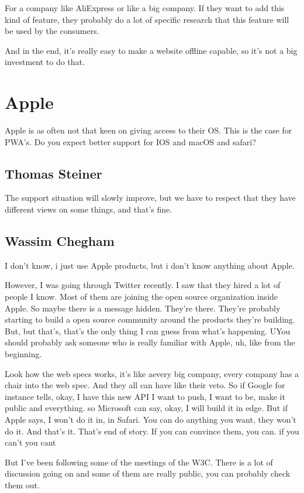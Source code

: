 			For a company like AliExpress or like a big company. If they want to add this kind of feature, they probably do a lot of specific research that this feature will be used by the consumers.
			
			And in the end, it's really easy to make a website offline capable, so it's not a big investment to do that.
		
		
	\section{Apple}
		Apple is as often not that keen on giving access to their OS. This is the case for PWA's. Do you expect better support for IOS and macOS and safari?
			
		\subsection{Thomas Steiner}
			The support situation will slowly improve, but we have to respect that they have different views on some things, and that’s fine.
		
		\subsection{Wassim Chegham}
			
			I don't know, i just use Apple products, but i don't know anything about Apple.
			
			However, I was going through Twitter recently. I saw that they hired a lot of people I know.   Most of them are joining the open source organization inside Apple. So maybe there is a message hidden. They're there. They're probably starting to build a open source community around the products they're building. But, but that's, that's the only thing I can guess from what's happening. UYou should probably ask someone who is really familiar with Apple, uh, like from the beginning.
			
			Look how the web specs works, it's like aevery big company, every company has  a chair into the web spec. And they all can have like their veto. So if Google for instance tells, okay, I have this new API I want to push, I want to be, make it public and everything. so Microsoft can say, okay, I will build it in edge. But if Apple says, I won't do it in, in Safari. You can do anything you want, they won't do it. And that's it. That's end of story. If you can convince them, you can. if you can't you cant
			
			But I've been following some of the meetings of the W3C. There is a lot of discussion going on and some of them are really public, you can probably check them out. 
			
